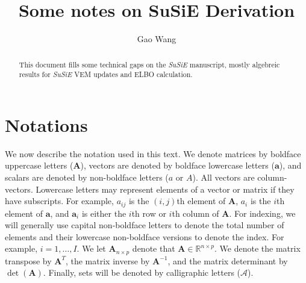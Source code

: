 \documentclass[11pt,authoryear]{article}
\numberwithin{equation}{section}
\theoremstyle{plain}
\newcommand{\susie}{\textsl{SuSiE}\xspace}
\begin{document}
\singlespacing
\title{Some notes on SuSiE Derivation}
\author{Gao Wang}
\maketitle

\begin{abstract}
This document fills some technical gaps on the \susie manuscript, mostly algebreic results for \susie VEM updates and ELBO calculation.
\end{abstract}

\section{Notations}

We now describe the notation used in this text. We denote matrices by
boldface uppercase letters ($\mathbf{A}$), vectors are denoted by boldface
lowercase letters ($\mathbf{a}$), and scalars are denoted by non-boldface
letters ($a$ or $A$). All vectors are column-vectors. Lowercase
letters may represent elements of a vector or matrix if they have
subscripts. For example, $a_{ij}$ is the $(i,j)$th element of
$\mathbf{A}$, $a_i$ is the $i$th element of $\mathbf{a}$, and $\mathbf{a}_{i}$ is
either the $i$th row or $i$th column of $\mathbf{A}$. For indexing, we
will generally use capital non-boldface letters to denote the total
number of elements and their lowercase non-boldface versions to denote
the index. For example, $i = 1,\ldots,I$. We let $\mathbf{A}_{n \times p}$
denote that $\mathbf{A} \in \mathbb{R}^{n \times p}$. We denote the matrix
transpose by $\mathbf{A}^T$, the matrix inverse by $\mathbf{A}^{-1}$,
and the matrix determinant by $\det(\mathbf{A})$. Finally, sets will be
denoted by calligraphic letters ($\mathcal{A}$).


\end{document}
